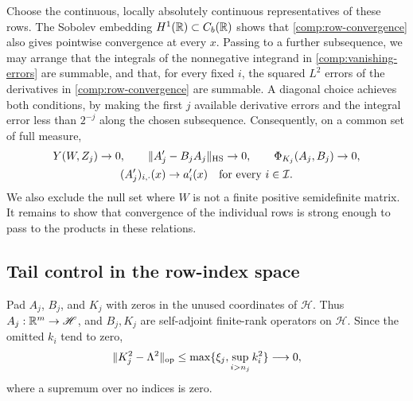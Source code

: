 Choose the continuous, locally absolutely continuous representatives
of these rows.  The Sobolev embedding $H^1(\mathbb R)\subset C_b(\mathbb R)$ shows
that \eqref{comp:row-convergence} also gives pointwise convergence at
every $x$.  Passing to a further subsequence, we may arrange that the
integrals of the nonnegative integrand in
\eqref{comp:vanishing-errors} are summable, and that, for every fixed
$i$, the squared $L^2$ errors of the derivatives in
\eqref{comp:row-convergence} are summable.  A diagonal choice achieves
both conditions, by making the first $j$ available derivative errors and the
integral error less than $2^{-j}$ along the chosen subsequence.
Consequently, on a common set of full measure,
\begin{equation}
 \begin{gathered}
 Y(W,Z_j)\to0,\qquad
 \|A_j'-B_jA_j\|_{\mathrm{HS}}\to0,\qquad
 \Phi_{K_j}(A_j,B_j)\to0,\\
 (A_j')_{i,\cdot}(x)\to a_i'(x)
       \quad\text{for every }i\in\mathcal I.
 \end{gathered}
 \label{comp:pointwise-errors}
\end{equation}
We also exclude the null set where $W$ is not a finite positive
semidefinite matrix.  It remains to show that convergence of the
individual rows is strong enough to pass to the products in these
relations.

\subsection{Tail control in the row-index space}
\label{comp:tails}

Pad $A_j$, $B_j$, and $K_j$ with zeros in the unused coordinates of
$\mathscr H$.  Thus $A_j:\mathbb R^m\to\mathscr H$, and $B_j,K_j$ are
self-adjoint finite-rank operators on $\mathscr H$.  Since the omitted
$k_i$ tend to zero,
\begin{equation}
 \|K_j^2-\Lambda^2\|_{\operatorname{op}}
    \leq\max\{\xi_j,\sup_{i>n_j}k_i^2\}\longrightarrow0,
 \label{comp:diagonal-limit}
\end{equation}
where a supremum over no indices is zero.

